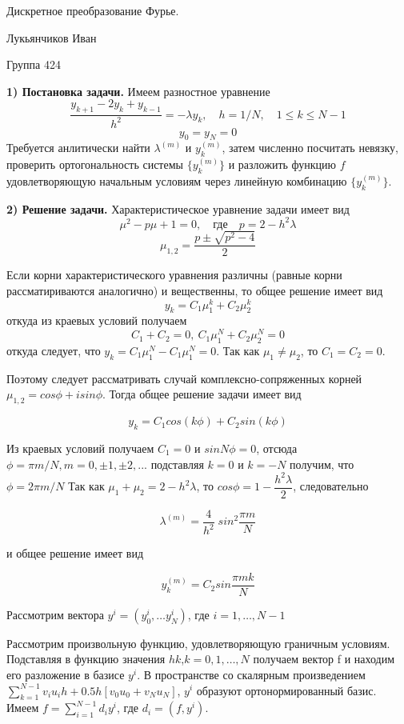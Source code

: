 \documentclass[12pt,a4paper]{scrartcl}
\begin{document}
\begin{titlepage}
\begin{center}
\large

Дискретное преобразование Фурье.

\end{center}
\vfill
\begin{flushright}
Лукьянчиков Иван

Группа 424
\end{flushright}
\end{titlepage}
\textbf{1) Постановка задачи.}
Имеем разностное уравнение
$$\dfrac{y_{k+1}-2y_{k}+y_{k-1}}{h^2}=-\lambda y_k, \quad h=1/N, \quad 1 \leqslant k \leqslant N-1$$
$$y_0=y_N=0$$
Требуется анлитически найти $\lambda^{(m)}$ и $y_k^{(m)}$, затем численно посчитать невязку, проверить ортогональность системы $\{y_k^{(m)}\}$ и разложить функцию $f$ удовлетворяющую начальным условиям через линейную комбинацию $\{y_k^{(m)}\}$.

\textbf{2) Решение задачи.}
Характеристическое уравнение задачи имеет вид
$$\mu^2 - p\mu + 1 = 0, \quad \text{где} \quad  p=2 - h^2 \lambda$$
$$\mu_{1,2} = \dfrac{p \pm \sqrt{p^2 - 4}}{2}$$

Если корни характеристического уравнения различны (равные корни рассматириваются аналогично) и вещественны, то общее решение имеет вид $$y_k = C_1 \mu_1^k + C_2 \mu_2^k$$ откуда из краевых условий получаем $$C_1 + C_2 = 0, \   C_1 \mu_1^N + C_2 \mu_2^N = 0 $$ откуда следует, что $y_k = C_1 \mu_1^N - C_1 \mu_1^N = 0$. Так как $\mu_1 \neq \mu_2$, то $C_1 = C_2 = 0$.

Поэтому следует рассматривать случай комплексно-сопряженных корней $\mu_{1,2} = cos\phi + isin\phi$. Тогда общее решение задачи имеет вид

$$y_k = C_1 cos(k \phi) + C_2 sin(k \phi)$$

Из краевых условий получаем $C_1 = 0$ и $sinN\phi = 0$, отсюда $\phi = \pi m / N, m=0,\pm1,\pm2,...$ подставляя $k = 0$ и $k = -N$ получим, что $\phi = 2 \pi m / N$ Так как $\mu_1 + \mu_2 = 2 - h^2 \lambda$, то $cos \phi = 1 - \dfrac{h^2 \lambda}{2}$, следовательно

$$\lambda^{(m)} = \dfrac{4}{h^2} \; sin^2 \dfrac{\pi m}{N}$$

и общее решение имеет вид

$$y_k^{(m)} = C_2 sin \dfrac{\pi m k}{N} $$

Рассмотрим вектора $y^i = (y_0^{i}, \dots y_N^{i})$, где $i = 1, \dots, N-1$

Рассмотрим произвольную функцию, удовлетворяющую граничным условиям. Подставляя в функцию значения $hk$,$k=0,1, \dots ,N$ получаем вектор f и находим его разложение в базисе ${y^i}$. В пространстве со скалярным произведением $\sum_{k=1}^{N-1} v_i u_i h + 0.5h[v_0 u_0+v_N u_N]$, $y^i$ образуют ортонормированный базис. Имеем $f = \sum_{i=1}^{N-1} d_i y^i $, где $d_i = (f,y^i)$.
\end{document}
